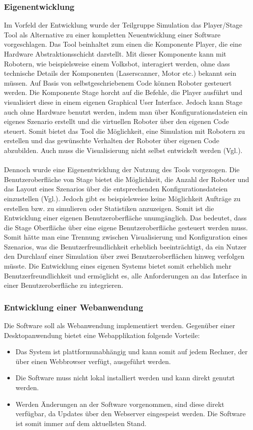 \subsubsection{Eigenentwicklung}
Im Vorfeld der Entwicklung wurde der Teilgruppe Simulation das Player/Stage Tool als Alternative zu einer kompletten Neuentwicklung einer Software vorgeschlagen. Das Tool beinhaltet zum einen die Komponente Player, die eine Hardware Abstraktionsschicht darstellt. Mit dieser Komponente kann mit Robotern, wie beispielsweise einem Volksbot, interagiert werden, ohne dass technische Details der Komponenten (Laserscanner, Motor etc.) bekannt sein müssen. Auf Basis von selbstgeschriebenem Code können Roboter gesteuert werden. Die Komponente Stage horcht auf die Befehle, die Player ausführt und visualisiert diese in einem eigenen Graphical User Interface. Jedoch kann Stage auch ohne Hardware benutzt werden, indem man über Konfigurationsdateien ein eigenes Szenario erstellt und die virtuellen Roboter über den eigenen Code steuert. Somit bietet das Tool die Möglichkeit, eine Simulation mit Robotern zu erstellen und das gewünschte Verhalten der Roboter über eigenen Code abzubilden. Auch muss die Visualisierung nicht selbst entwickelt werden (Vgl.\cite{plstg}). 
\\\\
Dennoch wurde eine Eigenentwicklung der Nutzung des Tools vorgezogen. Die Benutzeroberfläche von Stage bietet die Möglichkeit, die Anzahl der Roboter und das Layout eines Szenarios über die entsprechenden Konfigurationsdateien einzustellen (Vgl.\cite{plstg}). Jedoch gibt es beispielsweise keine Möglichkeit Aufträge zu erstellen bzw. zu simulieren oder Statistiken anzuzeigen. Somit ist die Entwicklung einer eigenen Benutzeroberfläche unumgänglich. Das bedeutet, dass die Stage Oberfläche über eine eigene Benutzeroberfläche gesteuert werden muss. Somit hätte man eine Trennung zwischen Visualisierung und Konfiguration eines Szenarios, was die Benutzerfreundlichkeit erheblich beeinträchtigt, da ein Nutzer den Durchlauf einer Simulation über zwei Benutzeroberflächen hinweg verfolgen müsste. Die Entwicklung eines eigenen Systems bietet somit erheblich mehr Benutzerfreundlichkeit und ermöglicht es, alle Anforderungen an das Interface in einer Benutzeroberfläche zu integrieren. 
\subsubsection{Entwicklung einer Webanwendung}\label{sec:Entwicklung einer Webanwendung} 
Die Software soll als Webanwendung implementiert werden. Gegenüber einer Desktopanwendung bietet eine Webapplikation folgende Vorteile:
\begin{itemize}
\item Das System ist plattformunabhängig und kann somit auf jedem Rechner, der über einen Webbrowser verfügt, ausgeführt werden.
\item Die Software muss nicht lokal installiert werden und kann direkt genutzt werden.
\item Werden Änderungen an der Software vorgenommen, sind diese direkt verfügbar, da Updates über den Webserver eingespeist werden. Die Software ist somit immer auf dem aktuellsten Stand. 
\end{itemize}
